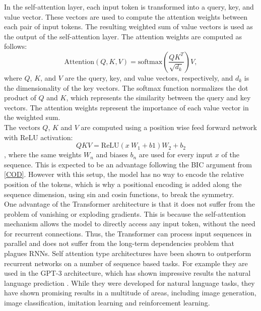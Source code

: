 In the self-attention layer, each input token is transformed into a query, key, and value vector.
These vectors are used to compute the attention weights between each pair of input tokens.
The resulting weighted sum of value vectors is used as the output of the self-attention layer.
The attention weights are computed as follows:
\begin{equation}
\text{Attention}(Q, K, V) = \text{softmax}\left(\frac{QK^T}{\sqrt{d_k}}\right)V,
\end{equation}
where $Q$, $K$, and $V$ are the query, key, and value vectors, respectively, and $d_k$ is the dimensionality of the key vectors.
The softmax function normalizes the dot product of $Q$ and $K$, which represents the similarity between the query and key vectors.
The attention weights represent the importance of each value vector in the weighted sum.\\
The vectors $Q$, $K$ and $V$ are computed using a position wise feed forward network with ReLU activation:
\begin{equation}
    QKV = \text{ReLU}(x \ W_1 + b1)W_2 + b_2
\end{equation}
, where the same weights $W_n$ and biases $b_n$ are used for every input $x$ of the sequence. This is expected to be an advantage following the BIC argument from \ref{COD}.  
However with this setup, the model has no way to encode the relative position of the tokens, which is why a positional encoding is added along the sequence dimension, 
using sin and cosin functions, to break the symmetry. \\
One advantage of the Transformer architecture is that it does not suffer from the problem of vanishing or exploding gradients.
This is because the self-attention mechanism allows the model to directly access any input token, without the need for recurrent connections.
Thus, the Transformer can process input sequences in parallel and does not suffer from the long-term dependencies problem that plagues RNNs. Self attention type 
architectures have been shown to outperform recurrent networks on a number of sequence based tasks. For example they are used in the GPT-3 architecture, which has 
shown impressive results the natural language prediction \cite{https://arxiv.org/abs/2005.14165}. While they were developed for natural language tasks, they have 
shown promising results in a multitude of areas, including image generation, image classification, imitation learning and reinforcement learning.